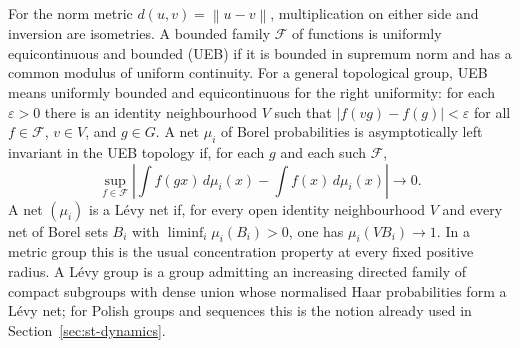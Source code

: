 For the norm metric \(d(u,v)=\left\|u-v\right\|\), multiplication on either
side and inversion are isometries. A bounded family \(\mathcal F\) of
functions is uniformly equicontinuous and bounded (UEB) if it is
bounded in supremum norm and has a common modulus of uniform continuity.
For a general topological group, UEB means uniformly bounded and
equicontinuous for the right uniformity: for each \(\varepsilon>0\)
there is an identity neighbourhood \(V\) such that
\(\left|f(vg)-f(g)\right|<\varepsilon\) for all \(f\in\mathcal F\),
\(v\in V\), and \(g\in G\).
A net \(\mu_i\) of Borel probabilities is asymptotically left invariant
in the UEB topology if, for each \(g\) and each such \(\mathcal F\),
\[
 \sup_{f\in\mathcal F}
 \left|\int f(gx)\,d\mu_i(x)-\int f(x)\,d\mu_i(x)\right|\longrightarrow0.
\]
A net \((\mu_i)\) is a L\'evy net if, for every open identity
neighbourhood \(V\) and every net of Borel sets \(B_i\) with
\(\liminf_i\mu_i(B_i)>0\), one has \(\mu_i(VB_i)\to1\).
In a metric group this is the usual concentration property at every
fixed positive radius. A L\'evy group is a group admitting an increasing
directed family of compact subgroups with dense union whose normalised
Haar probabilities form a L\'evy net; for Polish groups and sequences
this is the notion already used in Section~\ref{sec:st-dynamics}.

